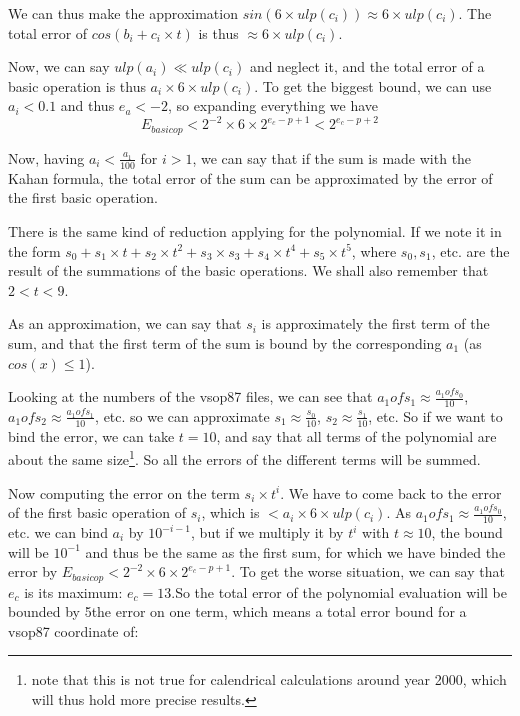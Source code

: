 We can thus make the approximation $sin(6\times ulp(c_i))\approx 6\times ulp(c_i)$. The total error of $cos(b_i+c_i\times t)$ is thus $\approx 6\times ulp(c_i)$.

Now, we can say $ulp(a_i) \ll ulp(c_i)$ and neglect it, and the total error of a basic operation is thus $a_i\times 6\times ulp(c_i)$. To get the biggest bound, we can use $a_i<0.1$ and thus $e_a<-2$, so expanding everything we have 
$$E_{basicop} < 2^{-2}\times 6 \times 2^{e_c-p+1} < 2^{e_c-p+2}$$

Now, having $a_i<\frac{a_1}{100}$ for $i>1$, we can say that if the sum is made with the Kahan formula, the total error of the sum can be approximated by the error of the first basic operation.

There is the same kind of reduction applying for the polynomial. If we note it in the form $s_0+s_1\times t+s_2\times t^2+s_3\times s_3+s_4\times t^4+s_5\times t^5$, where $s_0, s_1$, etc. are the result of the summations of the basic operations. We shall also remember that $2<t<9$. 

As an approximation, we can say that $s_i$ is approximately the first term of the sum, and that the first term of the sum is bound by the corresponding $a_1$ (as $cos(x)\leq 1$). 

Looking at the numbers of the vsop87 files, we can see that $a_1 of s_1 \approx \frac{a_1 of s_0}{10}$, $a_1 of s_2\approx \frac{a_1 of s_1}{10}$, etc. so we can approximate $s_1 \approx \frac{s_0}{10}$, $s_2\approx \frac{s_1}{10}$, etc. So if we want to bind the error, we can take $t=10$, and say that all terms of the polynomial are about the same size\footnote{note that this is not true for calendrical calculations around year 2000, which will thus hold more precise results.}. So all the errors of the different terms will be summed.

Now computing the error on the term $s_i\times t^i$. We have to come back to the error of the first basic operation of $s_i$, which is $< a_i\times 6\times ulp(c_i)$. As $a_1 of s_1\approx \frac{a_1 of s_0}{10}$, etc. we can bind $a_i$ by $10^{-i-1}$, but if we multiply it by $t^i$ with $t\approx 10$, the bound will be $10^{-1}$ and thus be the same as the first sum, for which we have binded the error by $E_{basicop} < 2^{-2}\times 6 \times 2^{e_c-p+1}$. To get the worse situation, we can say that $e_c$ is its maximum: $e_c=13$.So the total error of the polynomial evaluation will be bounded by 5\times the error on one term, which means a total error bound for a vsop87 coordinate of:

